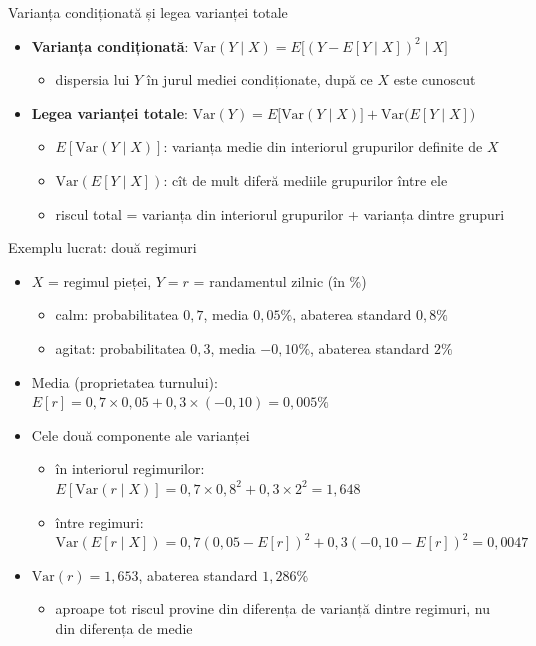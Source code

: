 \begin{frame}{Varianța condiționată și legea varianței totale}
\itemsize{\small}
\begin{itemize}
    \item \textbf{Varianța condiționată}: $\text{Var}(Y \mid X) = E\big[(Y - E[Y \mid X])^2 \mid X\big]$
    \begin{itemize}
        \item dispersia lui $Y$ în jurul mediei condiționate, după ce $X$ este cunoscut
    \end{itemize}
    \item \textbf{Legea varianței totale}: $\text{Var}(Y) = E\big[\text{Var}(Y \mid X)\big] + \text{Var}\big(E[Y \mid X]\big)$
    \begin{itemize}
        \item $E[\text{Var}(Y \mid X)]$: varianța medie din interiorul grupurilor definite de $X$
        \item $\text{Var}(E[Y \mid X])$: cît de mult diferă mediile grupurilor între ele
        \item riscul total = varianța din interiorul grupurilor + varianța dintre grupuri
    \end{itemize}
\end{itemize}
\end{frame}

\begin{frame}{Exemplu lucrat: două regimuri}
\itemsize{\footnotesize}
\begin{itemize}
    \item $X$ = regimul pieței, $Y = r$ = randamentul zilnic (în \%)
    \begin{itemize}
        \item calm: probabilitatea $0{,}7$, media $0{,}05\%$, abaterea standard $0{,}8\%$
        \item agitat: probabilitatea $0{,}3$, media $-0{,}10\%$, abaterea standard $2\%$
    \end{itemize}
    \item Media (proprietatea turnului): $E[r] = 0{,}7 \times 0{,}05 + 0{,}3 \times (-0{,}10) = 0{,}005\%$
    \item Cele două componente ale varianței
    \begin{itemize}
        \item în interiorul regimurilor: $E[\text{Var}(r \mid X)] = 0{,}7 \times 0{,}8^2 + 0{,}3 \times 2^2 = 1{,}648$
        \item între regimuri: $\text{Var}(E[r \mid X]) = 0{,}7(0{,}05 - E[r])^2 + 0{,}3(-0{,}10 - E[r])^2 = 0{,}0047$
    \end{itemize}
    \item $\text{Var}(r) = 1{,}653$, abaterea standard $1{,}286\%$
    \begin{itemize}
        \item aproape tot riscul provine din diferența de varianță dintre regimuri, nu din diferența de medie
    \end{itemize}
\end{itemize}
\end{frame}

